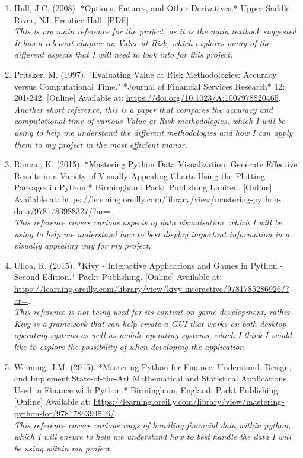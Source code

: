 \documentclass{article}
\begin{document}
\begin{enumerate}
  \item \label{ref6} Hull, J.C. (2008). *Options, Futures, and Other Derivatives.* Upper Saddle River, NJ: Prentice Hall. [PDF]
  \\\textit{This is my main reference for the project, as it is the main textbook suggested. It has a relevant chapter on Value at Risk, which explores many of the different aspects that I will need to look into for this project.}

  \item \label{ref7} Pritsker, M. (1997). "Evaluating Value at Risk Methodologies: Accuracy versus Computational Time." *Journal of Financial Services Research* 12: 201-242. [Online] Available at: \url{https://doi.org/10.1023/A:1007978820465}.
  \\\textit{Another short reference, this is a paper that compares the accuracy and computational time of various Value at Risk methodologies, which I will be using to help me understand the different methodologies and how I can apply them to my project in the most efficient manor. }

  \item \label{ref8} Raman, K. (2015). *Mastering Python Data Visualization: Generate Effective Results in a Variety of Visually Appealing Charts Using the Plotting Packages in Python.* Birmingham: Packt Publishing Limited. [Online] Available at: \url{https://learning.oreilly.com/library/view/mastering-python-data/9781783988327/?ar=}.
  \\\textit{This reference covers various aspects of data visualisation, which I will be using to help me understand how to best display important information in a visually appealing way for my project.}

  \item \label{ref9} Ulloa, R. (2015). *Kivy - Interactive Applications and Games in Python - Second Edition.* Packt Publishing. [Online] Available at: \url{https://learning.oreilly.com/library/view/kivy-interactive/9781785286926/?ar=}.
  \\\textit{This reference is not being used for its content on game development, rather Kivy is a framework that can help create a GUI that works on both desktop operating systems as well as mobile operating systems, which I think I would like to explore the possibility of when developing the application}

  \item \label{ref10} Weiming, J.M. (2015). *Mastering Python for Finance: Understand, Design, and Implement State-of-the-Art Mathematical and Statistical Applications Used in Finance with Python.* Birmingham, England: Packt Publishing. [Online] Available at: \url{https://learning.oreilly.com/library/view/mastering-python-for/9781784394516/}.
  \\\textit{This reference covers various ways of handling financial data within python, which I will ensure to help me understand how to best handle the data I will be using within my project.}
\end{enumerate}
\end{document}
